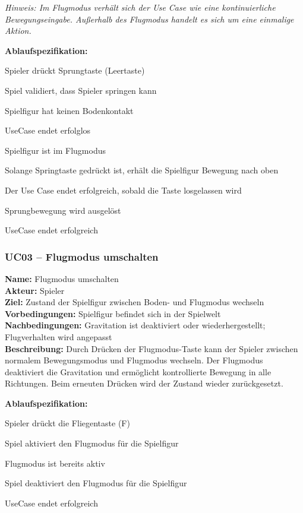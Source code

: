 \documentclass{article}
\begin{document}
\textit{Hinweis: Im Flugmodus verhält sich der Use Case wie eine kontinuierliche Bewegungseingabe. Außerhalb des Flugmodus handelt es sich um eine einmalige Aktion.}

\textbf{Ablaufspezifikation:}
\begin{description}[style=nextline,leftmargin=1.9cm,labelwidth=1.6cm]
  \item[1.] Spieler drückt Sprungtaste (Leertaste)
  \item[2.] Spiel validiert, dass Spieler springen kann
  \item[2a.] Spielfigur hat keinen Bodenkontakt
  \item[2a.1.] UseCase endet erfolglos
  \item[2b.] Spielfigur ist im Flugmodus
  \item[2b.1.] Solange Springtaste gedrückt ist, erhält die Spielfigur Bewegung nach oben
  \item[2b.2.] Der Use Case endet erfolgreich, sobald die Taste losgelassen wird
  \item[3.] Sprungbewegung wird ausgelöst
  \item[4.] UseCase endet erfolgreich
\end{description}

\newpage

\subsubsection*{UC03 – Flugmodus umschalten}

\textbf{Name:} Flugmodus umschalten \\
\textbf{Akteur:} Spieler \\
\textbf{Ziel:} Zustand der Spielfigur zwischen Boden- und Flugmodus wechseln \\
\textbf{Vorbedingungen:} Spielfigur befindet sich in der Spielwelt \\
\textbf{Nachbedingungen:} Gravitation ist deaktiviert oder wiederhergestellt; Flugverhalten wird angepasst \\
\textbf{Beschreibung:} Durch Drücken der Flugmodus-Taste kann der Spieler zwischen normalem Bewegungsmodus und Flugmodus wechseln. Der Flugmodus deaktiviert die Gravitation und ermöglicht kontrollierte Bewegung in alle Richtungen. Beim erneuten Drücken wird der Zustand wieder zurückgesetzt.

\textbf{Ablaufspezifikation:}
\begin{description}[style=nextline,leftmargin=1.9cm,labelwidth=1.6cm]
  \item[1.] Spieler drückt die Fliegentaste (F)
  \item[2.] Spiel aktiviert den Flugmodus für die Spielfigur
  \item[2a.] Flugmodus ist bereits aktiv
  \item[2a.1.] Spiel deaktiviert den Flugmodus für die Spielfigur
  \item[3.] UseCase endet erfolgreich
\end{description}
\end{document}
